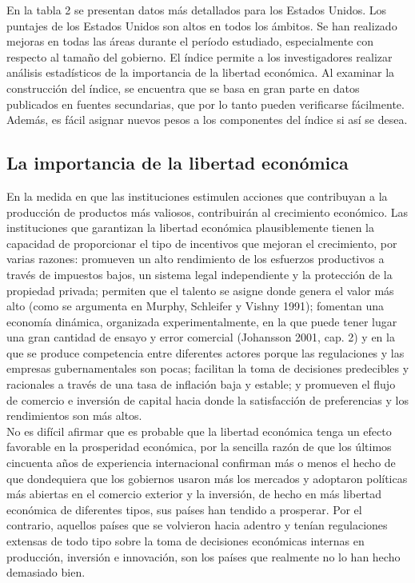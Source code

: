     En la tabla 2 se presentan datos más detallados para los Estados Unidos. Los puntajes de los Estados Unidos son altos en todos los ámbitos. Se han realizado mejoras en todas las áreas durante el período estudiado, especialmente con respecto al tamaño del gobierno. El índice permite a los investigadores realizar análisis estadísticos de la importancia de la libertad económica. Al examinar la construcción del índice, se encuentra que se basa en gran parte en datos publicados en fuentes secundarias, que por lo tanto pueden verificarse fácilmente. Además, es fácil asignar nuevos pesos a los componentes del índice si así se desea.\\

    \subsection*{La importancia de la libertad económica}
    En la medida en que las instituciones estimulen acciones que contribuyan a la producción de productos más valiosos, contribuirán al crecimiento económico. Las instituciones que garantizan la libertad económica plausiblemente tienen la capacidad de proporcionar el tipo de incentivos que mejoran el crecimiento, por varias razones: promueven un alto rendimiento de los esfuerzos productivos a través de impuestos bajos, un sistema legal independiente y la protección de la propiedad privada; permiten que el talento se asigne donde genera el valor más alto (como se argumenta en Murphy, Schleifer y Vishny 1991); fomentan una economía dinámica, organizada experimentalmente, en la que puede tener lugar una gran cantidad de ensayo y error comercial (Johansson 2001, cap. 2) y en la que se produce competencia entre diferentes actores porque las regulaciones y las empresas gubernamentales son pocas; facilitan la toma de decisiones predecibles y racionales a través de una tasa de inflación baja y estable; y promueven el flujo de comercio e inversión de capital hacia donde la satisfacción de preferencias y los rendimientos son más altos.\\

    No es difícil afirmar que es probable que la libertad económica tenga un efecto favorable en la prosperidad económica, por la sencilla razón de que los últimos cincuenta años de experiencia internacional confirman más o menos el hecho de que dondequiera que los gobiernos usaron más los mercados y adoptaron políticas más abiertas en el comercio exterior y la inversión, de hecho en más libertad económica de diferentes tipos, sus países han tendido a prosperar. Por el contrario, aquellos países que se volvieron hacia adentro y tenían regulaciones extensas de todo tipo sobre la toma de decisiones económicas internas en producción, inversión e innovación, son los países que realmente no lo han hecho demasiado bien.\\

